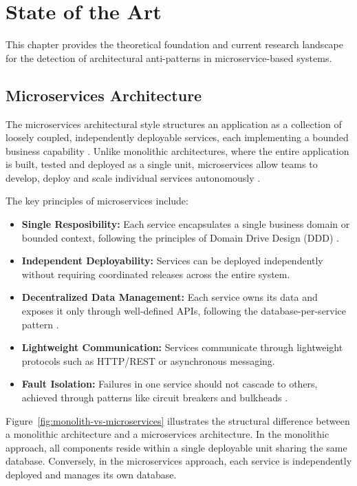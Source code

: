\chapter{State of the Art}
\label{chap:ch2}

\indent\par This chapter provides the theoretical foundation and current research landscape for the detection of architectural anti-patterns in microservice-based systems.

\section {Microservices Architecture}
\label{section:microservices-background}

\indent \par The microservices architectural style structures an application as a collection of loosely coupled, independently deployable services, each implementing a bounded business capability \cite{Newman2015}. Unlike monolithic architectures, where the entire application is built, tested and deployed as a single unit, microservices allow teams to develop, deploy and scale individual services autonomously \cite{Richardson2018}.

The key principles of microservices include:

\begin{itemize}
    \item \textbf{Single Resposibility:} Each service encapsulates a single business domain or bounded context, following the principles of Domain Drive Design (DDD) \cite{Evans2004}.
    \item \textbf{Independent Deployability:} Services can be deployed independently without requiring coordinated releases across the entire system.
    \item \textbf{Decentralized Data Management:} Each service owns its data and exposes it only through well-defined APIs, following the database-per-service pattern \cite{Richardson2018}.
    \item \textbf{Lightweight Communication:} Services communicate through lightweight protocols such as HTTP/REST or asynchronous messaging.
    \item \textbf{Fault Isolation:} Failures in one service should not cascade to others, achieved through patterns like circuit breakers and bulkheads \cite{Nygard2018}.
\end{itemize}

Figure~\ref{fig:monolith-vs-microservices} illustrates the structural difference between a monolithic architecture and a microservices architecture. In the monolithic approach, all components reside within a single deployable unit sharing the same database. Conversely, in the microservices approach, each service is independently deployed and manages its own database.

